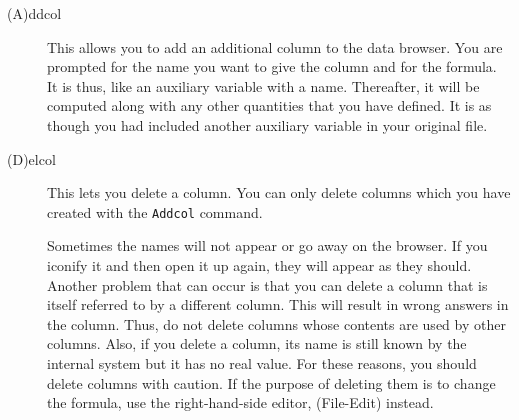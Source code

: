 \documentclass{article}
\begin{document}
\begin{description}
\item[(A)ddcol]  This allows you to add an additional column to the
data browser.  You are prompted for the name you want to give the
column and for the formula.  It is thus, like an auxiliary variable
with a name.  Thereafter, it will be computed along with any other
quantities that you have defined.  It is as though you had included
another auxiliary variable in your original file.
\item[(D)elcol]  This lets you delete a column.  You can only delete
columns which you have created with the {\tt Addcol} command.

Sometimes the names will not appear or  go away on the browser.
If you iconify it
and then open it up again, they will appear as they should.  Another
problem that can occur is that you can delete a column that is itself
referred to by a different column.  This will result in wrong answers
in the column. Thus, do not delete columns whose contents are used by
other columns.  Also, if you delete a column, its name is still known
by the internal system but it has no real value. For these reasons,
you should delete columns with caution.  If the purpose of deleting
them is to change the formula, use the right-hand-side editor,
(File-Edit) instead.



\end{description}
\end{document}
